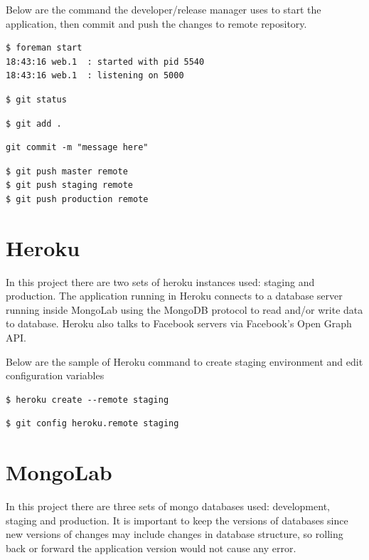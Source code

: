 Below are the command the developer/release manager uses to start the application, then commit and push the changes to remote repository.
\begin{lstlisting}
$ foreman start
18:43:16 web.1  : started with pid 5540
18:43:16 web.1  : listening on 5000
\end{lstlisting}

\begin{lstlisting}
$ git status
\end{lstlisting}

\begin{lstlisting}
$ git add .
\end{lstlisting}

\begin{lstlisting}
git commit -m "message here"
\end{lstlisting}

\begin{lstlisting}
$ git push master remote
$ git push staging remote
$ git push production remote
\end{lstlisting}


\section{Heroku}
In this project there are two sets of heroku instances used: staging and production. 
The application running in Heroku connects to a database server running inside MongoLab using the MongoDB protocol to read and/or write data to database.  Heroku also talks to Facebook servers via Facebook's Open Graph API.

Below are the sample of Heroku command to create staging environment and edit configuration variables
\begin{lstlisting}
$ heroku create --remote staging
\end{lstlisting}

\begin{lstlisting}
$ git config heroku.remote staging
\end{lstlisting}

\section{MongoLab}
In this project there are three sets of mongo databases used: development, staging and production. It is important to keep the versions of databases since new versions of changes may include changes in database structure, so rolling back or forward the application version would not cause any error. 

